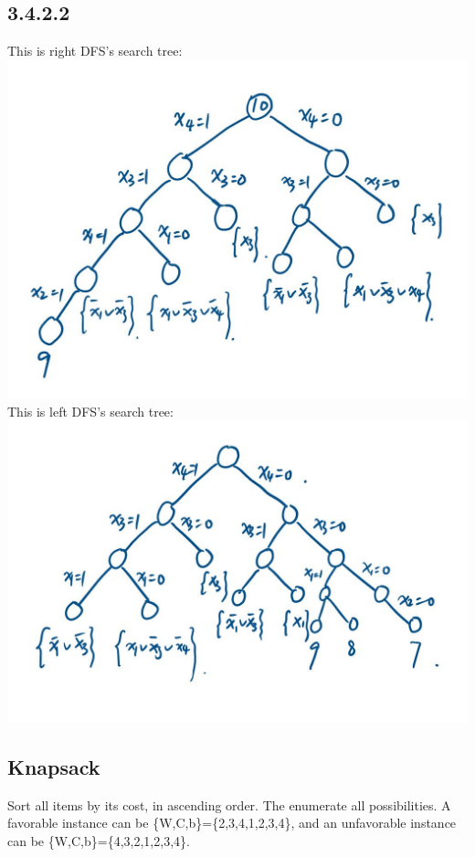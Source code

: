 \documentclass[twocolumn, 10.5pt]{article}
\begin{document}
	\subsection*{3.4.2.2}
	This is right DFS's search tree:\\
	\includegraphics[scale=0.31]{ex4-2.jpg}
	This is left DFS's search tree:\\
		\includegraphics[scale=0.32]{ex4-3.jpg}
	\subsection*{Knapsack}
	Sort all items by its cost, in ascending order. The enumerate all possibilities. A favorable instance can be \{W,C,b\}=\{2,3,4,1,2,3,4\}, and an unfavorable instance can be \{W,C,b\}=\{4,3,2,1,2,3,4\}. 
\end{document}
